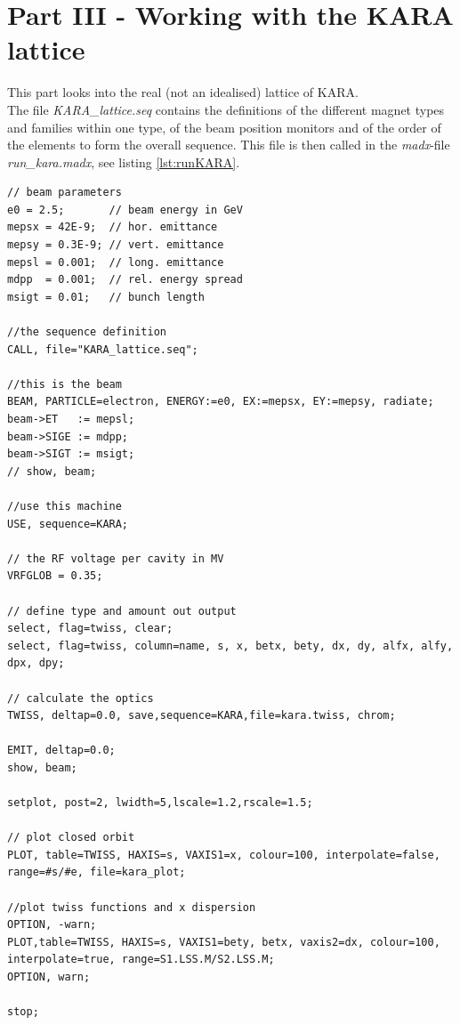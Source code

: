 \section{Part III - Working with the KARA lattice}
This part looks into the real (not an idealised) lattice of KARA.\\
The file \textit{KARA\_lattice.seq} contains the definitions of the different magnet types and families within one type, of the beam position monitors and of the order of the elements to form the overall sequence.
This file is then called in the \textit{madx}-file \textit{run\_kara.madx}, see listing \ref{lst:runKARA}.
\begin{lstlisting}[caption={Run file for the KARA lattice}, label={lst:runKARA},breaklines=true]
// beam parameters
e0 = 2.5;		// beam energy in GeV
mepsx = 42E-9;	// hor. emittance
mepsy = 0.3E-9;	// vert. emittance
mepsl = 0.001;	// long. emittance
mdpp  = 0.001;	// rel. energy spread
msigt = 0.01;	// bunch length

//the sequence definition
CALL, file="KARA_lattice.seq";

//this is the beam  
BEAM, PARTICLE=electron, ENERGY:=e0, EX:=mepsx, EY:=mepsy, radiate;
beam->ET   := mepsl;
beam->SIGE := mdpp;
beam->SIGT := msigt;
// show, beam;

//use this machine
USE, sequence=KARA;

// the RF voltage per cavity in MV
VRFGLOB = 0.35;

// define type and amount out output
select, flag=twiss, clear;
select, flag=twiss, column=name, s, x, betx, bety, dx, dy, alfx, alfy, dpx, dpy;

// calculate the optics
TWISS, deltap=0.0, save,sequence=KARA,file=kara.twiss, chrom;

EMIT, deltap=0.0;
show, beam;

setplot, post=2, lwidth=5,lscale=1.2,rscale=1.5;

// plot closed orbit
PLOT, table=TWISS, HAXIS=s, VAXIS1=x, colour=100, interpolate=false, range=#s/#e, file=kara_plot;

//plot twiss functions and x dispersion
OPTION, -warn;
PLOT,table=TWISS, HAXIS=s, VAXIS1=bety, betx, vaxis2=dx, colour=100, interpolate=true, range=S1.LSS.M/S2.LSS.M;
OPTION, warn;

stop;
\end{lstlisting}

